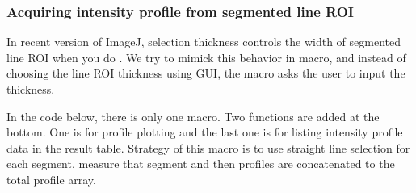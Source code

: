 \subsubsection{Acquiring intensity profile from segmented line ROI}
 
In recent version of ImageJ, selection thickness controls the width of segmented
line ROI when you do . We try to mimick this
behavior in macro, and instead of choosing the line ROI thickness using GUI, the
macro asks the user to input the thickness. 

In the code below, there is only one macro. Two functions are added at the
bottom. One is for profile plotting and the last one is for listing
intensity profile data in the result table. Strategy of this macro is to use
straight line selection for each segment, measure that segment and then profiles
are concatenated to the total profile array.

%
%


